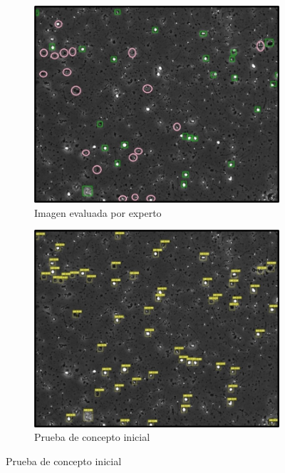 \documentclass[12pt,a4paper,onecolumn,oneside]{report}
\begin{document}
\begin{figure}[H]
  \centering
  \begin{subfigure}[b]{0.48\textwidth}
    \centering
    \includegraphics[width=\textwidth]{figuras/evaluacion_cualitativa/142/142.jpg}
    \caption{Imagen evaluada por experto}
    \label{fig:exp_image_142}
  \end{subfigure}
  \hfill
  \begin{subfigure}[b]{0.48\textwidth}
    \centering
    \includegraphics[width=\textwidth]{figuras/evaluacion_cualitativa/142/142_v7.jpg}
    \caption{Prueba de concepto inicial}
    \label{fig:poc_image_142}
  \end{subfigure}
  

\end{figure}
\end{document}
